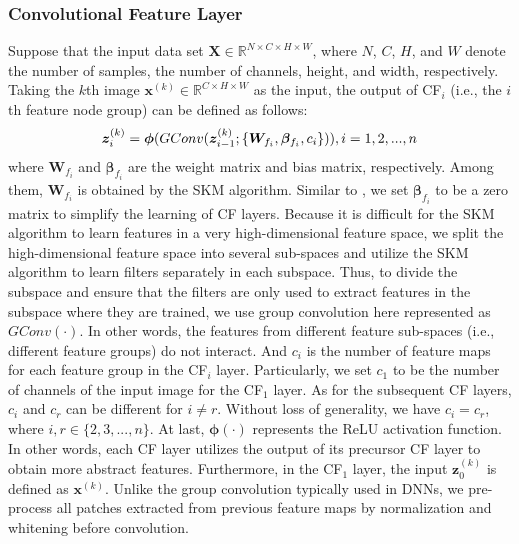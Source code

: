 \documentclass[lettersize,journal]{IEEEtran}
\begin{document}
\subsubsection{Convolutional Feature Layer}
Suppose that the input data set $\bm{X} \in \mathbb{R}^{N \times C \times H \times W}$, where $N$, $C$, $H$, and $W$ denote the number of samples, the number of channels, height, and width, respectively. Taking the $k$th image $\bm{x}^{(k)} \in \mathbb{R}^{C \times H \times W}$ as the input, the output of CF$_i$ (i.e., the $i$th feature node group) can be defined as follows:
\begin{equation}
\label{ConvBLS:z_i^{(k)}}
    \bm{z}_{i}^{(k)} = \bm{\phi} (GConv(\bm{z}_{i-1}^{(k)}; \{ \bm{W}_{f_i}, \bm{\beta}_{f_i}, c_i \})), i=1,2,...,n
\end{equation}
where $\bm{W}_{f_i}$ and $\bm{\beta}_{f_i}$ are the weight matrix and bias matrix, respectively. Among them, $\bm{W}_{f_i}$ is obtained by the SKM algorithm. Similar to \cite{huang2015local}, we set $\bm{\beta}_{f_i}$ to be a zero matrix to simplify the learning of CF layers. Because it is difficult for the SKM algorithm to learn features in a very high-dimensional feature space, we split the high-dimensional feature space into several sub-spaces and utilize the SKM algorithm to learn filters separately in each subspace. Thus, to divide the subspace and ensure that the filters are only used to extract features in the subspace where they are trained, we use group convolution here represented as $GConv(\cdot)$. In other words, the features from different feature sub-spaces (i.e., different feature groups) do not interact. And $c_i$ is the number of feature maps for each feature group in the CF$_i$ layer. Particularly, we set $c_1$ to be the number of channels of the input image for the CF$_1$ layer. As for the subsequent CF layers, $c_i$ and $c_r$ can be different for $i\ne r$. Without loss of generality, we have $c_i = c_r$, where $i, r \in \{2,3,...,n\}$. 
At last, $\bm{\phi} (\cdot)$ represents the ReLU activation function. In other words, each CF layer utilizes the output of its precursor CF layer to obtain more abstract features. Furthermore, in the CF$_1$ layer, the input $\bm{z}_{0}^{(k)}$ is defined as $\bm{x}^{(k)}$. Unlike the group convolution typically used in DNNs, we pre-process all patches extracted from previous feature maps by normalization and whitening before convolution.
\end{document}

